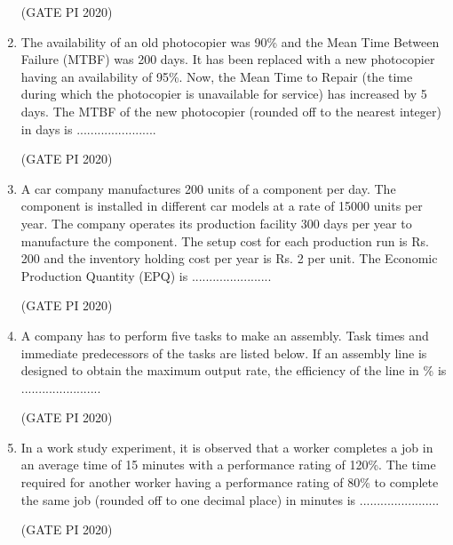 \documentclass[journal,12pt,onecolumn]{IEEEtran}
\theoremstyle{remark}
\begin{document}
\begin{enumerate}
\hfill (GATE PI 2020)

\item The availability of an old photocopier was 90\% and the Mean Time Between Failure (MTBF) was 200 days. It has been replaced with a new photocopier having an availability of 95\%. Now, the Mean Time to Repair (the time during which the photocopier is unavailable for service) has increased by 5 days. The MTBF of the new photocopier (rounded off to the nearest integer) in days is .......................

\hfill (GATE PI 2020)

\item A car company manufactures 200 units of a component per day. The component is installed in different car models at a rate of 15000 units per year. The company operates its production facility 300 days per year to manufacture the component. The setup cost for each production run is Rs. 200 and the inventory holding cost per year is Rs. 2 per unit. The Economic Production Quantity (EPQ) is .......................

\hfill (GATE PI 2020)

\item A company has to perform five tasks  to make an assembly. Task times and immediate predecessors of the tasks are listed below. If an assembly line is designed to obtain the maximum output rate, the efficiency of the line in \% is .......................



\hfill (GATE PI 2020)

\item In a work study experiment, it is observed that a worker completes a job in an average time of 15 minutes with a performance rating of 120\%. The time required for another worker having a performance rating of 80\% to complete the same job (rounded off to one decimal place) in minutes is .......................

\hfill (GATE PI 2020)

\end{enumerate}


\end{document}
